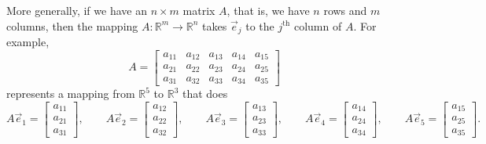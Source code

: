 More generally, if we have an $n \times m$ matrix $A$, that is, we have $n$ rows
and $m$ columns, then the mapping $A \colon {\mathbb R}^m \to {\mathbb R}^n$
takes $\vec{e}_j$ to the $j^{\text{th}}$ column of $A$.
For example,
\begin{equation*}
A =
\begin{bmatrix}
a_{11} & a_{12} & a_{13} & a_{14} & a_{15} \\
a_{21} & a_{22} & a_{23} & a_{24} & a_{25} \\
a_{31} & a_{32} & a_{33} & a_{34} & a_{35}
\end{bmatrix}
\end{equation*}
represents a mapping from ${\mathbb R}^5$ to ${\mathbb R}^3$ that does
\begin{equation*}
A \vec{e}_1 =
\begin{bmatrix}
a_{11} \\ a_{21} \\ a_{31}
\end{bmatrix} ,
\qquad
A \vec{e}_2 =
\begin{bmatrix}
a_{12} \\ a_{22} \\ a_{32}
\end{bmatrix} ,
\qquad
A \vec{e}_3 =
\begin{bmatrix}
a_{13} \\ a_{23} \\ a_{33}
\end{bmatrix} ,
\qquad
A \vec{e}_4 =
\begin{bmatrix}
a_{14} \\ a_{24} \\ a_{34}
\end{bmatrix} ,
\qquad
A \vec{e}_5 =
\begin{bmatrix}
a_{15} \\ a_{25} \\ a_{35}
\end{bmatrix} .
\end{equation*}

